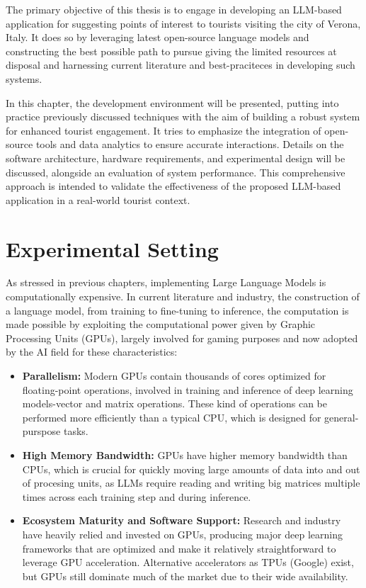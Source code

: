 The primary objective of this thesis is to engage in developing an LLM-based application for suggesting points of interest to tourists visiting the city of Verona, Italy. It does so by leveraging latest open-source language models and constructing the best possible path to pursue giving the limited resources at disposal and harnessing current literature and best-praciteces in developing such systems.

In this chapter, the development environment will be presented, putting into practice previously discussed techniques with the aim of building a robust system for enhanced tourist engagement. It tries to emphasize the integration of open-source tools and data analytics to ensure accurate interactions. Details on the software architecture, hardware requirements, and experimental design will be discussed, alongside an evaluation of system performance. This comprehensive approach is intended to validate the effectiveness of the proposed LLM-based application in a real-world tourist context.


\section{Experimental Setting}
\label{sec:experimental-setting}

As stressed in previous chapters, implementing Large Language Models is computationally expensive. In current literature and industry, the construction of a language model, from training to fine-tuning to inference, the computation is made possible by exploiting the computational power given by Graphic Processing Units (GPUs), largely involved for gaming purposes and now adopted by the AI field for these characteristics: \cite{gyawali2023gpu}

\begin{itemize}
    \item \textbf{Parallelism:} Modern GPUs contain thousands of cores optimized for floating-point operations, involved in training and inference of deep learning models-vector and matrix operations. These kind of operations can be performed more efficiently than a typical CPU, which is designed for general-purspose tasks.
    \item \textbf{High Memory Bandwidth:} GPUs have higher memory bandwidth than CPUs, which is crucial for quickly moving large amounts of data into and out of procesing units, as LLMs require reading and writing big matrices multiple times across each training step and during inference.
    \item \textbf{Ecosystem Maturity and Software Support:} Research and industry have heavily relied and invested on GPUs, producing major deep learning frameworks that are optimized and make it relatively straightforward to leverage GPU acceleration. Alternative accelerators as TPUs (Google) exist, but GPUs still dominate much of the market due to their wide availability.
\end{itemize}

